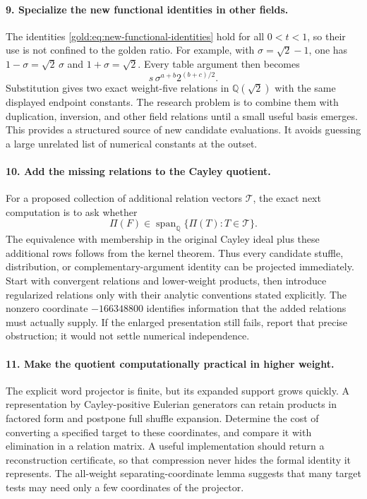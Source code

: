 \paragraph{9. Specialize the new functional identities in other fields.}
The identities \eqref{gold:eq:new-functional-identities} hold for all
$0<t<1$, so their use is not confined to the golden ratio. For
example, with $\sigma=\sqrt2-1$, one has
$1-\sigma=\sqrt2\,\sigma$ and $1+\sigma=\sqrt2$. Every table argument
then becomes
\[
 s\,\sigma^{a+b}2^{(b+c)/2}.
\]
Substitution gives two exact weight-five relations in
$\mathbb Q(\sqrt2)$ with the same displayed endpoint constants.
The research problem is to combine them with duplication, inversion,
and other field relations until a small useful basis emerges. This
provides a structured source of new candidate evaluations. It avoids
guessing a large unrelated list of numerical constants at the outset.

\paragraph{10. Add the missing relations to the Cayley quotient.}
For a proposed collection of additional relation vectors
$\mathcal T$, the exact next computation is to ask whether
\[
 \Pi(F)\in\operatorname{span}_{\mathbb Q}\{\Pi(T):T\in\mathcal T\}.
\]
The equivalence with membership in the original Cayley ideal plus
these additional rows follows from the kernel theorem. Thus every
candidate stuffle, distribution, or complementary-argument identity
can be projected immediately. Start with convergent relations and
lower-weight products, then introduce regularized relations only with
their analytic conventions stated explicitly. The nonzero coordinate
$-166348800$ identifies information that the added relations must
actually supply. If the enlarged presentation still fails, report
that precise obstruction; it would not settle numerical independence.

\paragraph{11. Make the quotient computationally practical in higher weight.}
The explicit word projector is finite, but its expanded support grows
quickly. A representation by Cayley-positive Eulerian generators can
retain products in factored form and postpone full shuffle expansion.
Determine the cost of converting a specified target to these
coordinates, and compare it with elimination in a relation matrix.
A useful implementation should return a reconstruction certificate,
so that compression never hides the formal identity it represents.
The all-weight separating-coordinate lemma suggests that many target
tests may need only a few coordinates of the projector.

